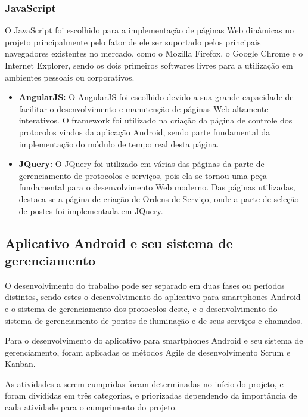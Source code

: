 \documentclass[
	article,			%
	11pt,				%
	oneside,			%
	a4paper,			%
	english,			%
	brazil,				%
	sumario=tradicional
	]{abntex2}
\begin{document}
\subsubsection{JavaScript}

O JavaScript foi escolhido para a implementação de páginas Web dinâmicas no projeto principalmente pelo fator de ele ser suportado pelos principais navegadores existentes no mercado, como o Mozilla Firefox, o Google Chrome e o Internet Explorer, sendo os dois primeiros softwares livres para a utilização em ambientes pessoais ou corporativos.

\begin{itemize}
\item \textbf{AngularJS:} O AngularJS foi escolhido devido a sua grande capacidade de facilitar o desenvolvimento e manutenção de páginas Web altamente interativos.
O framework foi utilizado na criação da página de controle dos protocolos vindos da aplicação Android, sendo parte fundamental da implementação do módulo de tempo real desta página.

\item \textbf{JQuery:} O JQuery foi utilizado em várias das páginas da parte de gerenciamento de protocolos e serviços, pois ela se tornou uma peça fundamental para o desenvolvimento Web moderno.
Das páginas utilizadas, destaca-se a página de criação de Ordens de Serviço, onde a parte de seleção de postes foi implementada em JQuery.

\end{itemize}

\subsection{Aplicativo Android e seu sistema de gerenciamento}
O desenvolvimento do trabalho pode ser separado em duas fases ou períodos distintos, sendo estes o desenvolvimento do aplicativo para smartphones Android e o sistema de gerenciamento dos protocolos deste, e o desenvolvimento do sistema de gerenciamento de pontos de iluminação e de seus serviços e chamados.

Para o desenvolvimento do aplicativo para smartphones Android e seu sistema de gerenciamento, foram aplicadas os métodos Agile de desenvolvimento Scrum e Kanban.

As atividades a serem cumpridas foram determinadas no início do projeto, e foram divididas em três categorias, e priorizadas dependendo da importância de cada atividade para o cumprimento do projeto.
\end{document}
